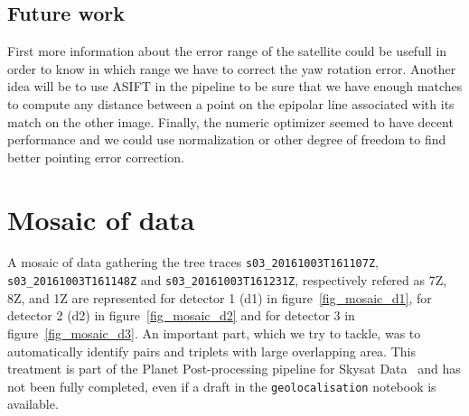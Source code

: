\documentclass[paper=a4, fontsize=11pt, onecolumn, tikz, dvipsnames, svgnames, x11names]{article}
\begin{document}
\subsection{Future work}
First more information about the error range of the satellite could be usefull in order to know in which range we have to correct the yaw rotation error. Another idea will be to use ASIFT in the pipeline to be sure that we have enough matches to compute any distance between a point on the epipolar line associated with its match on the other image. Finally, the numeric optimizer seemed to have decent performance and we could use normalization or other degree of freedom to find better pointing error correction.


\newpage

\appendix

\newpage
\section{Mosaic of data}
\label{appen_mosaic}

A mosaic of data gathering the tree traces \verb$s03_20161003T161107Z$, \verb$s03_20161003T161148Z$ and \verb$s03_20161003T161231Z$, respectively refered as 7Z, 8Z, and 1Z are represented for detector 1 (d1) in figure~\ref{fig_mosaic_d1}, for detector 2 (d2) in figure~\ref{fig_mosaic_d2} and for detector 3 in figure~\ref{fig_mosaic_d3}. An important part, which we try to tackle, was to automatically identify pairs and triplets with large overlapping area. This treatment is part of the Planet Post-processing pipeline for Skysat Data~\cite{planet_product} and has not been fully completed, even if a draft in the \verb$geolocalisation$ notebook is available.
\end{document}
